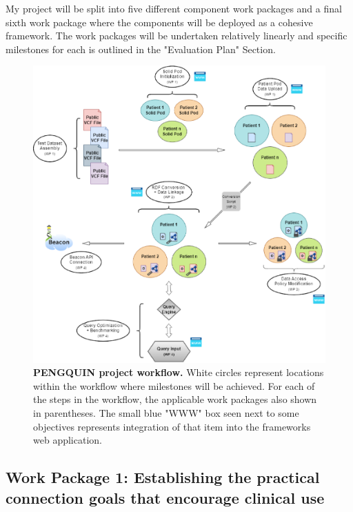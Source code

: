 \documentclass[runningheads]{llncs}
\begin{document}
My project will be split into five different component work packages and a final sixth work package where the components will be deployed as a cohesive framework. 
The work packages will be undertaken relatively linearly and specific milestones for each is outlined in the "Evaluation Plan" Section.

\begin{figure}
\includegraphics[width=\textwidth]{fig1.eps}
\caption{\textbf{PENGQUIN project workflow.}
White circles represent locations within the workflow where milestones will be achieved. 
For each of the steps in the workflow, the applicable work packages also shown in parentheses. 
The small blue "WWW" box seen next to some objectives represents integration of that item into the framework\textquotesingle s web application.
} \label{fig1}
\end{figure}

\subsection{Work Package 1: Establishing the practical connection goals that encourage clinical use}
\end{document}
